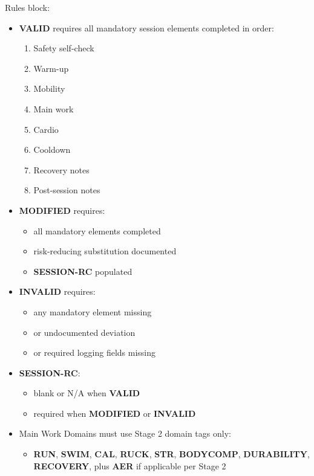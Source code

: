 \documentclass[10pt]{article}
\begin{document}
\begin{landscape}
\endgroup

Rules block:

\begin{itemize}
\item \textbf{VALID} requires all mandatory session elements completed in order:
  \begin{enumerate}
  \item Safety self-check
  \item Warm-up
  \item Mobility
  \item Main work
  \item Cardio
  \item Cooldown
  \item Recovery notes
  \item Post-session notes
  \end{enumerate}
\item \textbf{MODIFIED} requires:
  \begin{itemize}
  \item all mandatory elements completed
  \item risk-reducing substitution documented
  \item \textbf{SESSION-RC} populated
  \end{itemize}
\item \textbf{INVALID} requires:
  \begin{itemize}
  \item any mandatory element missing
  \item or undocumented deviation
  \item or required logging fields missing
  \end{itemize}
\item \textbf{SESSION-RC}:
  \begin{itemize}
  \item blank or N/A when \textbf{VALID}
  \item required when \textbf{MODIFIED} or \textbf{INVALID}
  \end{itemize}
\item Main Work Domains must use Stage 2 domain tags only:
  \begin{itemize}
  \item \textbf{RUN}, \textbf{SWIM}, \textbf{CAL}, \textbf{RUCK}, \textbf{STR}, \textbf{BODYCOMP}, \textbf{DURABILITY}, \textbf{RECOVERY}, plus \textbf{AER} if applicable per Stage 2
  \end{itemize}
\end{itemize}


\end{landscape}
\end{document}
